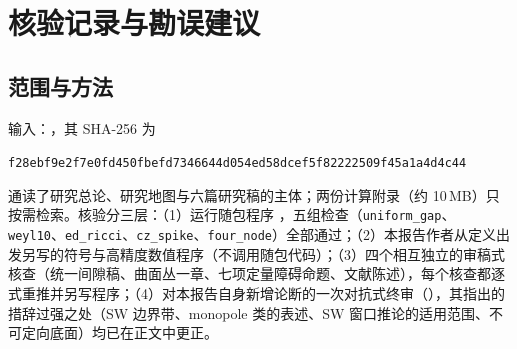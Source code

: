 \section{核验记录与勘误建议}\label{sec:verification}

\subsection{范围与方法}
输入：，其 SHA-256 为
\begin{center}\texttt{\small f28ebf9e2f7e0fd450fbefd7346644d054ed58dcef5f82222509f45a1a4d4c44}\end{center}
通读了研究总论、研究地图与六篇研究稿的主体；两份计算附录（约 10\,MB）只按需检索。核验分三层：（1）运行随包程序 ，五组检查（\texttt{uniform\_gap}、\texttt{weyl10}、\texttt{ed\_ricci}、\texttt{cz\_spike}、\texttt{four\_node}）全部通过；（2）本报告作者从定义出发另写的符号与高精度数值程序（不调用随包代码）；（3）四个相互独立的审稿式核查（统一间隙稿、曲面丛一章、七项定量障碍命题、文献陈述），每个核查都逐式重推并另写程序；（4）对本报告自身新增论断的一次对抗式终审（），其指出的措辞过强之处（SW 边界带、monopole 类的表述、SW 窗口推论的适用范围、不可定向底面）均已在正文中更正。

